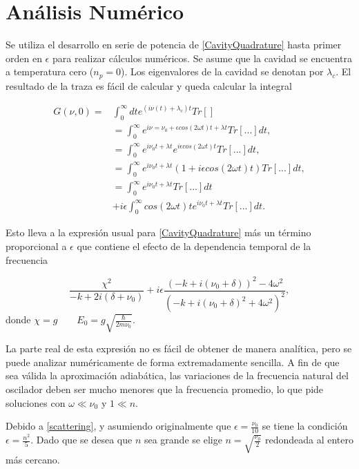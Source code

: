 \documentclass[10pt,a4paper]{report}
\begin{document}
\section{Análisis Numérico}

Se utiliza el desarrollo en serie de potencia de \eqref{CavityQuadrature} hasta primer orden en $\epsilon$ para realizar cálculos numéricos. Se asume que la cavidad se encuentra a temperatura cero ($n_p=0$). Los eigenvalores de la cavidad se denotan por $\lambda_c$. El resultado de la traza es fácil de calcular y queda calcular la integral


\begin{align}
G(\nu,0)=&\int_0^\infty dt e^{(i\nu(t)+\lambda_c) t}Tr[]\\
&= \int_0^\infty e^{i \nu = \nu_0 + \epsilon cos(2\omega t) t + \lambda t} Tr[...]dt, \\
&=\int_0^\infty e^{i \nu_0 t + \lambda t}e^{i \epsilon cos(2\omega t)t} Tr[...]dt, \\
&=\int_0^\infty e^{i \nu_0 t + \lambda t}(1+i \epsilon cos(2\omega t)t) Tr[...]dt, \\
&=\int_0^\infty e^{i \nu_0 t + \lambda t}Tr[...]dt\\
&+i\epsilon\int_0^\infty cos(2\omega t)t e^{i \nu_0 t + \lambda t}Tr[...]dt.
\end{align}

Esto lleva a la expresión usual para \ref{CavityQuadrature} más un término proporcional a $\epsilon$ que contiene el efecto de la dependencia temporal de la frecuencia

\begin{equation}
 \frac{\chi^2}{-k + 2i(\delta + \nu_0)} +i\epsilon\frac{(-k + i(\nu_0 + \delta))^2 - 4\omega^2}{(-k + i(\nu_0 + \delta)^2 + 4\omega^2)^2},
\end{equation} donde $\chi = g \qquad E_0 = g \sqrt{\frac{\hbar}{2m\nu_0}}$.

La parte real de esta expresión no es fácil de obtener de manera analítica, pero se puede analizar numéricamente de forma extremadamente sencilla. A fin de que sea válida la aproximación adiabática, las variaciones de la frecuencia natural del oscilador deben ser mucho menores que la frecuencia promedio, lo que pide soluciones con  $\omega \ll \nu_0$ y $1 \ll n$.

Debido a \ref{scattering}, y asumiendo originalmente que $\epsilon = \frac{\nu_0}{10}$ se tiene la condición $\epsilon = \frac{n^2}{5}$. Dado que se desea que $n$ sea grande se elige $n=\sqrt{\frac{\nu_0}{2}}$ redondeada al entero más cercano.
\end{document}
